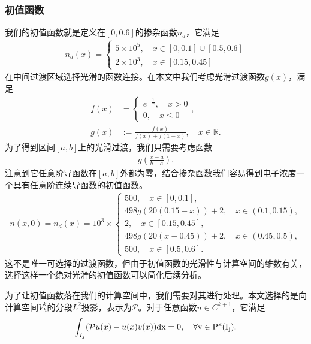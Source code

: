 \subsubsection{初值函数}
我们的初值函数就是定义在$[0, 0.6]$的掺杂函数$n_d$，它满足
\begin{align*}
	n_d(x) = \begin{cases}
		         5\times 10^{5}, \quad x \in [0, 0.1] \cup [0.5, 0.6] \\
		         2\times 10^{3}, \quad x \in [0.15,0.45]
	         \end{cases}
\end{align*}
在中间过渡区域选择光滑的函数连接。在本文中我们考虑光滑过渡函数$g(x)$，满足
\begin{align*}
	f(x)               & ={\begin{cases}
		                       e^{-{\frac {1}{x}}}, \quad x>0 \\
		                       0, \quad x\leq 0\end{cases}} ,                      \\
	\displaystyle g(x) & :={\frac {f(x)}{f(x)+f(1-x)}},\quad x\in \mathbb {R}.
\end{align*}
为了得到区间$[a,b]$上的光滑过渡，我们只需要考虑函数
\begin{align*}
	g(\frac{x-a}{b-a}).
\end{align*}
注意到它任意阶导函数在$[a,b]$外都为零，结合掺杂函数我们容易得到电子浓度一个具有任意阶连续导函数的初值函数。
\begin{align}
	n(x,0) = n_d(x) = 10^3 \times
	\begin{cases}
		500,\quad x\in [0,0.1],                        \\
		498g(20(0.15-x)) + 2,\quad x \in (0.1, 0.15),  \\
		2, \quad x\in [0.15, 0.45],                    \\
		498g(20(x-0.45)) + 2, \quad x \in (0.45, 0.5), \\
		500, \quad x\in [0.5, 0.6].
	\end{cases}
\end{align}
这不是唯一可选择的过渡函数，但由于初值函数的光滑性与计算空间的维数有关，选择这样一个绝对光滑的初值函数可以简化后续分析。

为了让初值函数落在我们的计算空间中，我们需要对其进行处理。本文选择的是向计算空间$V_h^k$的分段$L^2$投影，表示为$\mathcal{P}$。对于任意函数$u\in C^{k+1}$，它满足
\begin{align}
	\int_{I_j}(\mathcal{P}u(x)-u(x)v(x)) \rm{d}x = 0, \quad \forall v \in P^k(I_j).
\end{align}
